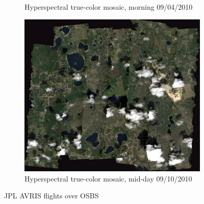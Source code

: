 \documentclass[remotesensing,article,accept,moreauthors,pdftex,12pt,a4paper]{mdpi}
\begin{document}
\begin{figure}[t]
\begin{subfigure}[b]{0.3\textwidth}
        \caption{Hyperspectral true-color mosaic, morning 09/04/2010}
        \label{fig:JPL_AVIRIS_true_color_mosaic_OSBS_9_4_10}
    \end{subfigure}
    \hfill
    \begin{subfigure}[b]{0.3\textwidth}
        \centering
        \includegraphics[width=\textwidth]{./images/JPL_AVIRIS_true_color_mosaic_OSBS_9_10_10.png}
        \caption{Hyperspectral true-color mosaic, mid-day 09/10/2010}
        \label{fig:JPL_AVIRIS_true_color_mosaic_OSBS_9_10_10}
    \end{subfigure}
    \caption{JPL AVRIS flights over OSBS \cite{neon2010aopdatarelease}}
    \label{fig:hyperspectral}
\end{figure}
\end{document}
